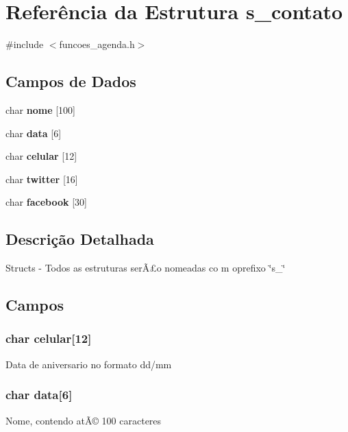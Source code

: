 \section{Referência da Estrutura s\+\_\+contato}
\label{structs__contato}


{\ttfamily \#include $<$funcoes\+\_\+agenda.\+h$>$}

\subsection*{Campos de Dados}
\begin{DoxyCompactItemize}
\item 
char {\bf nome} [100]
\item 
char {\bf data} [6]
\item 
char {\bf celular} [12]
\item 
char {\bf twitter} [16]
\item 
char {\bf facebook} [30]
\end{DoxyCompactItemize}


\subsection{Descrição Detalhada}
Structs -\/ Todos as estruturas serÃ£o nomeadas co m oprefixo \char`\"{}s\+\_\+\char`\"{} 

\subsection{Campos}
\subsubsection[{celular}]{\setlength{\rightskip}{0pt plus 5cm}char celular[12]}\label{structs__contato_a2120c6a39953a341d114cf7f28b7a7a9}
Data de aniversario no formato dd/mm 
\subsubsection[{data}]{\setlength{\rightskip}{0pt plus 5cm}char data[6]}\label{structs__contato_a3825e3e0922badc8848709cf608821ea}
Nome, contendo atÃ© 100 caracteres 
